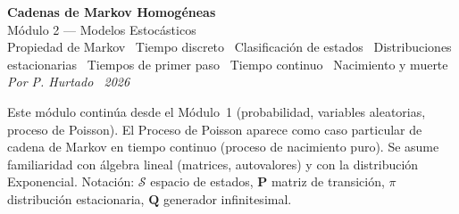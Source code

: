 \documentclass[10pt,a4paper]{article}
\numberwithin{equation}{section}
\newcommand{\Sset}{\mathcal{S}}                          %
\newcommand{\Pmat}{\mathbf{P}}                           %
\newcommand{\generator}{\mathbf{Q}}                      %
\newenvironment{nota}{\begin{tcolorbox}[notebox]}{\end{tcolorbox}}
\begin{document}

\begin{tcolorbox}[
    colback=sectionbg, colupper=white, colframe=sectionbg,
    sharp corners, left=12pt, right=12pt, top=10pt, bottom=10pt,
  ]
  {\Large\bfseries\sffamily Cadenas de Markov Homog\'eneas}\\[4pt]
  {\normalsize\sffamily M\'odulo 2 --- Modelos Estoc\'asticos}\\[6pt]
  {\small\sffamily\color{white!80!sectionbg}
    Propiedad de Markov \textperiodcentered\ Tiempo discreto \textperiodcentered\
    Clasificaci\'on de estados \textperiodcentered\ Distribuciones estacionarias
    \textperiodcentered\ Tiempos de primer paso \textperiodcentered\
    Tiempo continuo \textperiodcentered\ Nacimiento y muerte}\\[6pt]
  {\footnotesize\sffamily\color{white!85!sectionbg}\itshape
    Por P. Hurtado \textperiodcentered\ 2026}
\end{tcolorbox}

\vspace{4pt}
\begin{nota}
  Este m\'odulo contin\'ua desde el M\'odulo~1 (probabilidad, variables aleatorias, proceso de Poisson).
  El Proceso de Poisson aparece como caso particular de cadena de Markov en tiempo continuo
  (proceso de nacimiento puro). Se asume familiaridad con \'algebra lineal (matrices, autovalores)
  y con la distribuci\'on Exponencial. Notaci\'on: $\Sset$ espacio de estados, $\Pmat$ matriz de
  transici\'on, $\pi$ distribuci\'on estacionaria, $\generator$ generador infinitesimal.
\end{nota}

\tableofcontents
\end{document}
